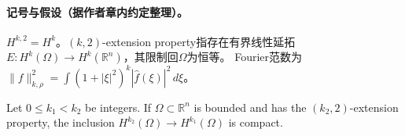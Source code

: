 
\paragraph{记号与假设（据作者章内约定整理）。}
$H^{k,2}=H^k$。$(k,2)$-extension property指存在有界线性延拓
$E:H^k(\Omega)\to H^k(\mathbb R^n)$，其限制回$\Omega$为恒等。
Fourier范数为$\|f\|_{k,\rho}^2=\int(1+|\xi|^2)^k|\widehat f(\xi)|^2\,d\xi$。
\begin{theorem}
Let $0\leq k_1<k_2$ be integers. If $\Omega\subset\mathbb R^n$ is
bounded and has the $(k_2,2)$-extension property, the inclusion
$H^{k_2}(\Omega)\to H^{k_1}(\Omega)$ is compact.
\end{theorem}
